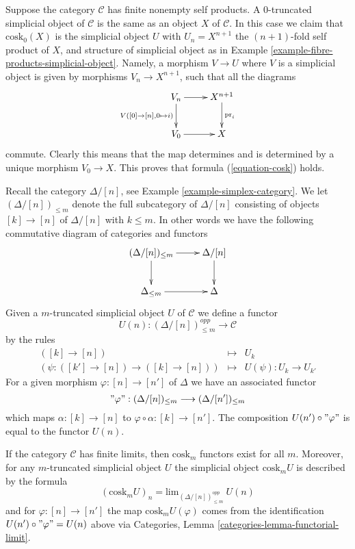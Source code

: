 \begin{example}
\label{example-cosk0}
Suppose the category $\mathcal{C}$ has finite nonempty self products.
A $0$-truncated simplicial object of $\mathcal{C}$ is the same
as an object $X$ of $\mathcal{C}$. In this case
we claim that $\text{cosk}_0(X)$ is the simplicial
object $U$ with $U_n = X^{n + 1}$ the $(n + 1)$-fold self
product of $X$, and structure of simplicial object
as in Example \ref{example-fibre-products-simplicial-object}.
Namely, a morphism $V \to U$ where $V$ is a simplicial
object is given by morphisms $V_n \to X^{n + 1}$, such
that all the diagrams
$$
\xymatrix{
V_n \ar[r] \ar[d]_{V([0] \to [n], 0 \mapsto i)} &
X^{n + 1} \ar[d]^{\text{pr}_i} \\
V_0 \ar[r] &
X
}
$$
commute. Clearly this means that the map determines and is determined
by a unique morphism $V_0 \to X$. This proves that formula
(\ref{equation-cosk}) holds.
\end{example}

\noindent
Recall the category $\Delta/[n]$, see Example \ref{example-simplex-category}.
We let $(\Delta/[n])_{\leq m}$ denote the full subcategory
of $\Delta/[n]$ consisting of objects $[k] \to [n]$
of $\Delta/[n]$ with $k \leq m$. In other words we have
the following commutative diagram of categories and functors
$$
\xymatrix{
(\Delta/[n])_{\leq m} \ar[r] \ar[d] &
\Delta/[n] \ar[d] \\
\Delta_{\leq m} \ar[r] &
\Delta
}
$$
Given a $m$-truncated
simplicial object $U$ of $\mathcal{C}$
we define a functor
$$
U(n) : (\Delta/[n])_{\leq m}^{opp} \longrightarrow \mathcal{C}
$$
by the rules
\begin{eqnarray*}
([k] \to [n]) & \longmapsto & U_k \\
(\psi : ([k'] \to [n]) \to ([k] \to [n])) &
\longmapsto &
U(\psi) : U_k \to U_{k'}
\end{eqnarray*}
For a given morphism $\varphi : [n] \to [n']$ of $\Delta$
we have an associated functor
$$
"\varphi" : (\Delta/[n])_{\leq m} \longrightarrow (\Delta/[n'])_{\leq m}
$$
which maps $\alpha : [k] \to [n]$ to
$\varphi \circ \alpha : [k] \to [n']$.
The composition $U(n') \circ "\varphi"$ is
equal to the functor $U(n)$.

\begin{lemma}
\label{lemma-existence-cosk}
If the category $\mathcal{C}$ has finite limits, then
$\text{cosk}_m$ functors exist for all $m$. Moreover,
for any $m$-truncated simplicial object $U$ the
simplicial object $\text{cosk}_mU$ is described
by the formula
$$
(\text{cosk}_mU)_n = \text{lim}_{(\Delta/[n])_{\leq m}^{opp}}\ U(n)
$$
and for $\varphi : [n] \to [n']$ the map
$\text{cosk}_mU(\varphi)$ comes from the
identification $U(n') \circ "\varphi" = U(n)$ above
via Categories, Lemma \ref{categories-lemma-functorial-limit}.
\end{lemma}

